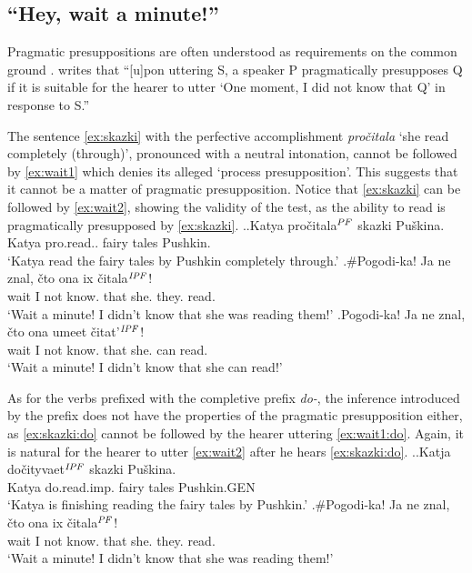 \subsection{``Hey, wait a minute!''}
Pragmatic presuppositions are often understood as requirements on the common ground \citep[see e.g.,][]{Karttunen:73, Stalnaker:73, Shanon:76, Heim:83}. \citet[][248]{Shanon:76} writes that ``[u]pon uttering S, a speaker P pragmatically presupposes Q if it is suitable for the hearer to utter `One moment, I did not know that Q' in response to S.''

The sentence \ref{ex:skazki} with the perfective accomplishment \textit{pro\v{c}itala} `she read completely (through)', pronounced with a neutral intonation, cannot be followed by \ref{ex:wait1} which denies its alleged `process presupposition'. This suggests that it cannot be a matter of pragmatic presupposition. Notice that \ref{ex:skazki} can be followed by \ref{ex:wait2}, showing the validity of the test, as the ability to read is pragmatically presupposed by \ref{ex:skazki}.
\ex.\ag.\label{ex:skazki}Katya pro\v{c}itala$^{\mathit{PF}}$ skazki Pu\v{s}kina.\\
Katya pro.read.. {fairy tales} Pushkin.\\
\vspace{0.5em}
`Katya read the fairy tales by Pushkin completely through.'
\bg.\#Pogodi-ka! Ja ne znal, \v{c}to ona ix \v{c}itala$^{\mathit{IPF}}$!\label{ex:wait1}\\
wait I not know. that she. they. read.\\
\vspace{0.5em}
`Wait a minute! I didn't know that she was reading them!'
\bg.\label{ex:wait2}Pogodi-ka! Ja ne znal, \v{c}to ona umeet \v{c}itat'$^{\mathit{IPF}}$!\\
wait I not know. that she. can read.\\
\vspace{0.5em}
`Wait a minute! I didn't know that she can read!'


As for the verbs prefixed with the completive prefix \textit{do-}, the inference introduced by the prefix does not have the properties of the pragmatic presupposition either, as \ref{ex:skazki:do} cannot be followed by the hearer uttering \ref{ex:wait1:do}. Again, it is natural for the hearer to utter \ref{ex:wait2} after he hears \ref{ex:skazki:do}.
\ex.\ag.\label{ex:skazki:do}Katja do\v{c}ityvaet$^{\mathit{IPF}}$ skazki Pu\v{s}kina.\\
Katya do.read.imp. {fairy tales} Pushkin.{\tiny GEN}\\
`Katya is finishing reading the fairy tales by Pushkin.'
\bg.\#Pogodi-ka! Ja ne znal, \v{c}to ona ix \v{c}itala$^{\mathit{PF}}$!\label{ex:wait1:do}\\
wait I not know. that she. they. read.\\
`Wait a minute! I didn't know that she was reading them!'

